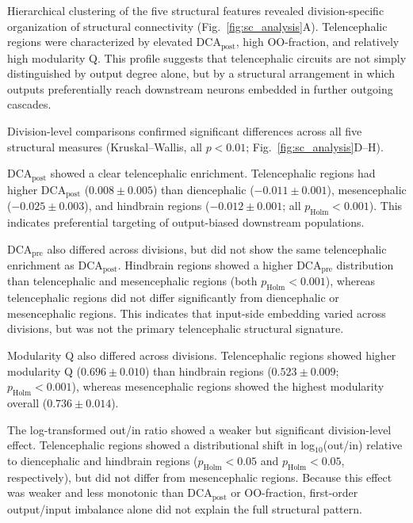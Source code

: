 \documentclass[9pt,twocolumn,twoside]{pnas-new}
\begin{document}
Hierarchical clustering of the five structural features revealed division-specific organization of structural connectivity (Fig.~\ref{fig:sc_analysis}A).
Telencephalic regions were characterized by elevated $\mathrm{DCA}_{\mathrm{post}}$, high OO-fraction, and relatively high modularity Q.
This profile suggests that telencephalic circuits are not simply distinguished by output degree alone, but by a structural arrangement in which outputs preferentially reach downstream neurons embedded in further outgoing cascades.

Division-level comparisons confirmed significant differences across all five structural measures (Kruskal--Wallis, all $p < 0.01$; Fig.~\ref{fig:sc_analysis}D--H).

$\mathrm{DCA}_{\mathrm{post}}$ showed a clear telencephalic enrichment. Telencephalic regions had higher $\mathrm{DCA}_{\mathrm{post}}$ ($0.008 \pm 0.005$) than diencephalic ($-0.011 \pm 0.001$), mesencephalic ($-0.025 \pm 0.003$), and hindbrain regions ($-0.012 \pm 0.001$; all $p_{\mathrm{Holm}} < 0.001$). This indicates preferential targeting of output-biased downstream populations.

$\mathrm{DCA}_{\mathrm{pre}}$ also differed across divisions, but did not show the same telencephalic enrichment as $\mathrm{DCA}_{\mathrm{post}}$. Hindbrain regions showed a higher $\mathrm{DCA}_{\mathrm{pre}}$ distribution than telencephalic and mesencephalic regions (both $p_{\mathrm{Holm}} < 0.001$), whereas telencephalic regions did not differ significantly from diencephalic or mesencephalic regions. This indicates that input-side embedding varied across divisions, but was not the primary telencephalic structural signature.

Modularity Q also differed across divisions. Telencephalic regions showed higher modularity Q ($0.696 \pm 0.010$) than hindbrain regions ($0.523 \pm 0.009$; $p_{\mathrm{Holm}} < 0.001$), whereas mesencephalic regions showed the highest modularity overall ($0.736 \pm 0.014$).

The log-transformed out/in ratio showed a weaker but significant division-level effect. Telencephalic regions showed a distributional shift in log$_{10}$(out/in) relative to diencephalic and hindbrain regions ($p_{\mathrm{Holm}} < 0.05$ and $p_{\mathrm{Holm}} < 0.05$, respectively), but did not differ from mesencephalic regions. Because this effect was weaker and less monotonic than $\mathrm{DCA}_{\mathrm{post}}$ or OO-fraction, first-order output/input imbalance alone did not explain the full structural pattern.
\end{document}
